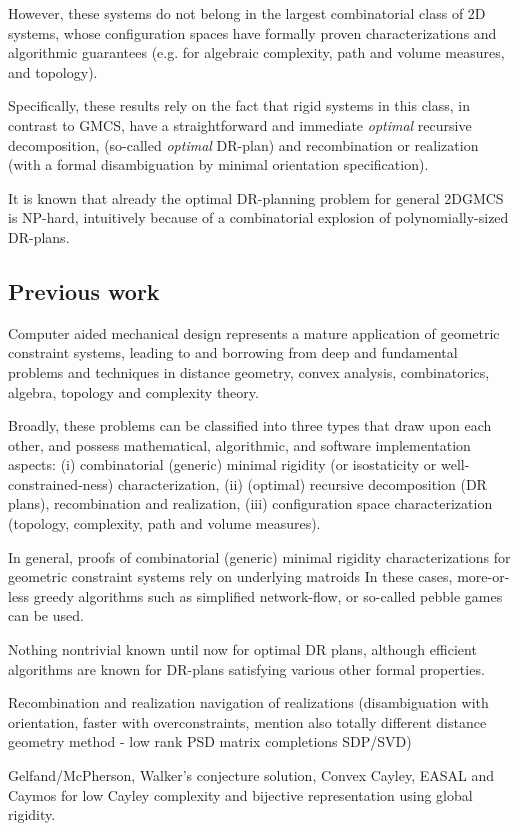 However, these systems do not 
belong in the largest combinatorial class of 2D systems, whose configuration spaces have formally proven  characterizations and 
algorithmic guarantees (e.g. for algebraic complexity, path and volume measures, and  topology).

Specifically, these results  rely on the fact that rigid systems in this  class, in contrast to GMCS, 
have a straightforward and immediate {\sl optimal} recursive decomposition, (so-called {\sl optimal} DR-plan) and  recombination 
or realization (with a formal disambiguation by minimal orientation specification).

It is known  that already the optimal DR-planning problem for general 2DGMCS is NP-hard, intuitively 
because of a combinatorial explosion of polynomially-sized DR-plans.  


\subsection{Previous work}

Computer aided mechanical design represents a mature application of geometric constraint systems,  leading to and borrowing 
from deep and fundamental problems and techniques in distance geometry, convex analysis, combinatorics, algebra, topology 
and complexity theory.

Broadly, these problems can be classified into three types that draw upon each other, and possess mathematical, algorithmic, 
and software implementation aspects: (i) combinatorial (generic) minimal rigidity (or isostaticity or well-constrained-ness) 
characterization, (ii) (optimal) recursive decomposition (DR plans), recombination and realization, (iii) configuration space 
characterization (topology, complexity, path and volume measures).

In general, proofs of combinatorial (generic) minimal rigidity characterizations for geometric constraint systems rely on 
underlying matroids  In these cases, more-or-less greedy algorithms such as simplified network-flow, 
or so-called pebble games can be used.

Nothing nontrivial known until now for optimal DR plans, although efficient algorithms are known for DR-plans satisfying 
various other formal properties.

Recombination and realization navigation of realizations (disambiguation with orientation, faster with overconstraints, mention 
also totally different distance geometry method - low rank PSD matrix completions SDP/SVD)

Gelfand/McPherson, Walker's conjecture solution, Convex Cayley, EASAL and Caymos for low Cayley complexity and bijective 
representation using global rigidity.
